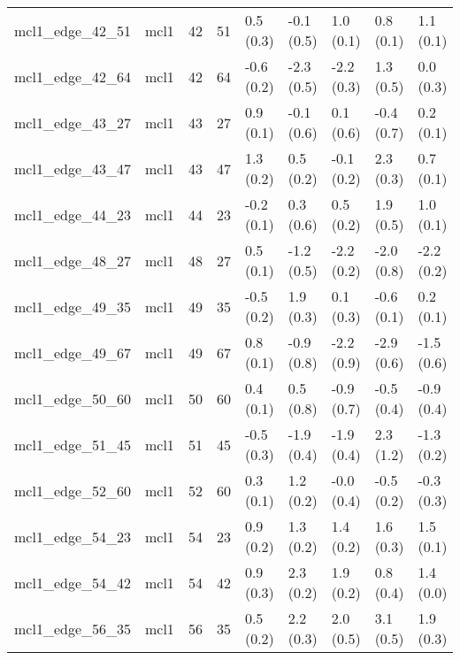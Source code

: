 \begin{tabular}{lllllllll}
mcl1\_edge\_42\_51                  &      mcl1 &          42 &          51 &   0.5 (0.3) &        -0.1 (0.5) &   1.0 (0.1) &   0.8 (0.1) &   1.1 (0.1) \\
mcl1\_edge\_42\_64                  &      mcl1 &          42 &          64 &  -0.6 (0.2) &        -2.3 (0.5) &  -2.2 (0.3) &   1.3 (0.5) &   0.0 (0.3) \\
mcl1\_edge\_43\_27                  &      mcl1 &          43 &          27 &   0.9 (0.1) &        -0.1 (0.6) &   0.1 (0.6) &  -0.4 (0.7) &   0.2 (0.1) \\
mcl1\_edge\_43\_47                  &      mcl1 &          43 &          47 &   1.3 (0.2) &         0.5 (0.2) &  -0.1 (0.2) &   2.3 (0.3) &   0.7 (0.1) \\
mcl1\_edge\_44\_23                  &      mcl1 &          44 &          23 &  -0.2 (0.1) &         0.3 (0.6) &   0.5 (0.2) &   1.9 (0.5) &   1.0 (0.1) \\
mcl1\_edge\_48\_27                  &      mcl1 &          48 &          27 &   0.5 (0.1) &        -1.2 (0.5) &  -2.2 (0.2) &  -2.0 (0.8) &  -2.2 (0.2) \\
mcl1\_edge\_49\_35                  &      mcl1 &          49 &          35 &  -0.5 (0.2) &         1.9 (0.3) &   0.1 (0.3) &  -0.6 (0.1) &   0.2 (0.1) \\
mcl1\_edge\_49\_67                  &      mcl1 &          49 &          67 &   0.8 (0.1) &        -0.9 (0.8) &  -2.2 (0.9) &  -2.9 (0.6) &  -1.5 (0.6) \\
mcl1\_edge\_50\_60                  &      mcl1 &          50 &          60 &   0.4 (0.1) &         0.5 (0.8) &  -0.9 (0.7) &  -0.5 (0.4) &  -0.9 (0.4) \\
mcl1\_edge\_51\_45                  &      mcl1 &          51 &          45 &  -0.5 (0.3) &        -1.9 (0.4) &  -1.9 (0.4) &   2.3 (1.2) &  -1.3 (0.2) \\
mcl1\_edge\_52\_60                  &      mcl1 &          52 &          60 &   0.3 (0.1) &         1.2 (0.2) &  -0.0 (0.4) &  -0.5 (0.2) &  -0.3 (0.3) \\
mcl1\_edge\_54\_23                  &      mcl1 &          54 &          23 &   0.9 (0.2) &         1.3 (0.2) &   1.4 (0.2) &   1.6 (0.3) &   1.5 (0.1) \\
mcl1\_edge\_54\_42                  &      mcl1 &          54 &          42 &   0.9 (0.3) &         2.3 (0.2) &   1.9 (0.2) &   0.8 (0.4) &   1.4 (0.0) \\
mcl1\_edge\_56\_35                  &      mcl1 &          56 &          35 &   0.5 (0.2) &         2.2 (0.3) &   2.0 (0.5) &   3.1 (0.5) &   1.9 (0.3) \\

\end{tabular}
